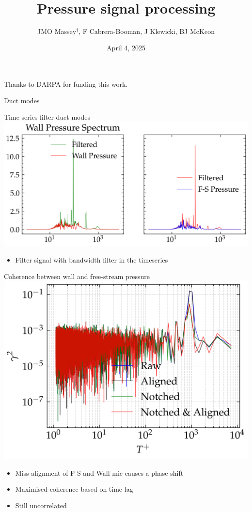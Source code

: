 \documentclass[aspectratio=169]{beamer}
\title{Pressure signal processing}
\author{JMO Massey$^{\dag}$, F Cabrera-Booman, J Klewicki, BJ McKeon}
\institute{Center for Turbulence Research \\ Stanford University}
\date{April 4, 2025}
\begin{document}
\begin{frame}
    \setcounter{framenumber}{0}
    \titlepage
    \vfill
    {\scriptsize \centering Thanks to DARPA for funding this work.\par}
\end{frame}

\begin{frame}{Duct modes}
\end{frame}

\begin{frame}{Time series filter duct modes}
    \centering
    \includegraphics[width=0.7\linewidth]{figures/notched_pressure_spectrum.png}
    \begin{itemize}
            \centering
        \item Filter signal with bandwidth filter in the timeseries
    \end{itemize}

\end{frame}

\begin{frame}{Coherence between wall and free-stream pressure}
    \centering
    \includegraphics[width=0.7\linewidth]{figures/coherence.png}
    \begin{itemize}
        \item Miss-alignment of F-S and Wall mic causes a phase shift
        \item Maximised coherence based on time lag
        \item Still uncorrelated
    \end{itemize}
\end{frame}
\end{document}
